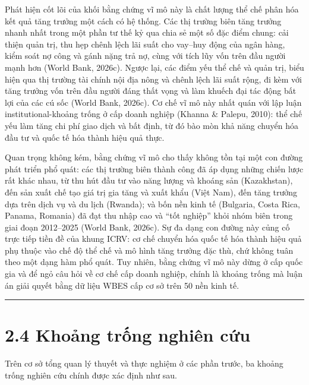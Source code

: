 \documentclass[
  a4paper,
  13pt]{extreport}
\begin{document}
Phát hiện cốt lõi của khối bằng chứng vĩ mô này là chất lượng thể chế
phân hóa kết quả tăng trưởng một cách có hệ thống. Các thị trường biên
tăng trưởng nhanh nhất trong một phần tư thế kỷ qua chia sẻ một số đặc
điểm chung: cải thiện quản trị, thu hẹp chênh lệch lãi suất cho vay--huy
động của ngân hàng, kiểm soát nợ công và gánh nặng trả nợ, cùng với tích
lũy vốn trên đầu người mạnh hơn (World Bank, 2026c). Ngược lại, các điểm
yếu thể chế và quản trị, biểu hiện qua thị trường tài chính nội địa nông
và chênh lệch lãi suất rộng, đi kèm với tăng trưởng vốn trên đầu người
đáng thất vọng và làm khuếch đại tác động bất lợi của các cú sốc (World
Bank, 2026c). Cơ chế vĩ mô này nhất quán với lập luận
institutional-khoảng trống ở cấp doanh nghiệp (Khanna \& Palepu, 2010):
thể chế yếu làm tăng chi phí giao dịch và bất định, từ đó bào mòn khả
năng chuyển hóa đầu tư và quốc tế hóa thành hiệu quả thực.

Quan trọng không kém, bằng chứng vĩ mô cho thấy không tồn tại một con
đường phát triển phổ quát: các thị trường biên thành công đã áp dụng
những chiến lược rất khác nhau, từ thu hút đầu tư vào năng lượng và
khoáng sản (Kazakhstan), đến sản xuất chế tạo giá trị gia tăng và xuất
khẩu (Việt Nam), đến tăng trưởng dựa trên dịch vụ và du lịch (Rwanda);
và bốn nền kinh tế (Bulgaria, Costa Rica, Panama, Romania) đã đạt thu
nhập cao và ``tốt nghiệp'' khỏi nhóm biên trong giai đoạn 2012--2025
(World Bank, 2026c). Sự đa dạng con đường này củng cố trực tiếp tiền đề
của khung ICRV: cơ chế chuyển hóa quốc tế hóa thành hiệu quả phụ thuộc
vào chế độ thể chế và mô hình tăng trưởng đặc thù, chứ không tuân theo
một dạng hàm phổ quát. Tuy nhiên, bằng chứng vĩ mô này dừng ở cấp quốc
gia và để ngỏ câu hỏi về cơ chế cấp doanh nghiệp, chính là khoảng trống
mà luận án giải quyết bằng dữ liệu WBES cấp cơ sở trên 50 nền kinh tế.

\begin{center}\rule{0.5\linewidth}{0.5pt}\end{center}

\hypertarget{khoux1ea3ng-trux1ed1ng-nghiuxean-cux1ee9u}{%
\section{2.4 Khoảng trống nghiên
cứu}\label{khoux1ea3ng-trux1ed1ng-nghiuxean-cux1ee9u}}

Trên cơ sở tổng quan lý thuyết và thực nghiệm ở các phần trước, ba
khoảng trống nghiên cứu chính được xác định như sau.
\end{document}

